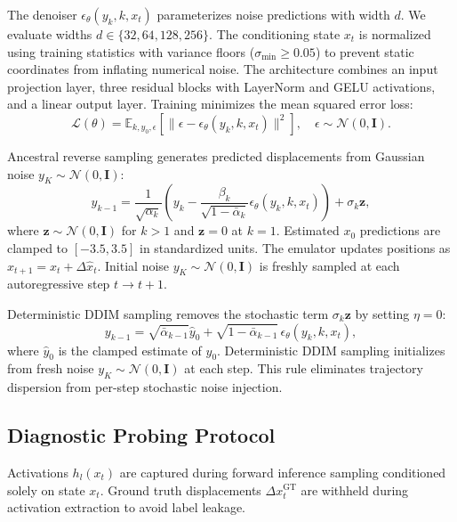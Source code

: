\documentclass[11pt,a4paper]{article}
\begin{document}
The denoiser $\epsilon_\theta(y_k, k, x_t)$ parameterizes noise predictions with width $d$. We evaluate widths $d \in \{32, 64, 128, 256\}$. The conditioning state $x_t$ is normalized using training statistics with variance floors ($\sigma_{\min} \ge 0.05$) to prevent static coordinates from inflating numerical noise. The architecture combines an input projection layer, three residual blocks with LayerNorm and GELU activations, and a linear output layer. Training minimizes the mean squared error loss:
\begin{equation}
    \mathcal{L}(\theta) = \mathbb{E}_{k, y_0, \epsilon}\left[\|\epsilon - \epsilon_\theta(y_k, k, x_t)\|^2\right], \quad \epsilon \sim \mathcal{N}(0, \mathbf{I}).
\end{equation}

Ancestral reverse sampling generates predicted displacements from Gaussian noise $y_K \sim \mathcal{N}(0, \mathbf{I})$:
\begin{equation}
    y_{k-1} = \frac{1}{\sqrt{\alpha_k}}\left(y_k - \frac{\beta_k}{\sqrt{1 - \bar{\alpha}_k}}\epsilon_\theta(y_k, k, x_t)\right) + \sigma_k \mathbf{z},
\end{equation}
where $\mathbf{z} \sim \mathcal{N}(0, \mathbf{I})$ for $k > 1$ and $\mathbf{z} = 0$ at $k=1$. Estimated $x_0$ predictions are clamped to $[-3.5, 3.5]$ in standardized units. The emulator updates positions as $\hat{x}_{t+1} = x_t + \Delta \hat{x}_t$. Initial noise $y_K \sim \mathcal{N}(0, \mathbf{I})$ is freshly sampled at each autoregressive step $t \to t+1$.

Deterministic DDIM sampling \cite{song2020denoising} removes the stochastic term $\sigma_k \mathbf{z}$ by setting $\eta = 0$:
\begin{equation}
    y_{k-1} = \sqrt{\bar{\alpha}_{k-1}}\hat{y}_0 + \sqrt{1 - \bar{\alpha}_{k-1}}\,\epsilon_\theta(y_k, k, x_t),
\end{equation}
where $\hat{y}_0$ is the clamped estimate of $y_0$. Deterministic DDIM sampling initializes from fresh noise $y_K \sim \mathcal{N}(0, \mathbf{I})$ at each step. This rule eliminates trajectory dispersion from per-step stochastic noise injection.

\subsection{Diagnostic Probing Protocol}

Activations $h_l(x_t)$ are captured during forward inference sampling conditioned solely on state $x_t$. Ground truth displacements $\Delta x_t^{\mathrm{GT}}$ are withheld during activation extraction to avoid label leakage.
\end{document}
